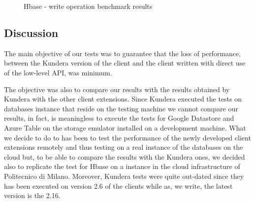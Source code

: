 \begin{figure}[tbh]
  \centering
  \qquad
  \caption{Hbase - write operation benchmark results}
  \label{fig:hbase-test-write}
\end{figure} 

\subsection{Discussion}
The main objective of our tests was to guarantee that the loss of performance, between the Kundera version of the client and the client written with direct use of the low-level API, was minimum.

\noindent The objective was also to compare our results with the results obtained by Kundera with the other client extensions. Since Kundera executed the tests on databases instance that reside on the testing machine we cannot compare our results, in fact, is meaningless to execute the tests for Google Datastore and Azure Table on the storage emulator installed on a development machine. What we decide to do to has been to test the performance of the newly developed client extensions remotely and thus testing on a real instance of the databases on the cloud but, to be able to compare the results with the Kundera ones, we decided also to replicate the test for Hbase on a instance in the cloud infrastructure of Politecnico di Milano.
Moreover, Kundera tests were quite out-dated since they has been executed on version 2.6 of the clients while as, we write, the latest version is the 2.16.

